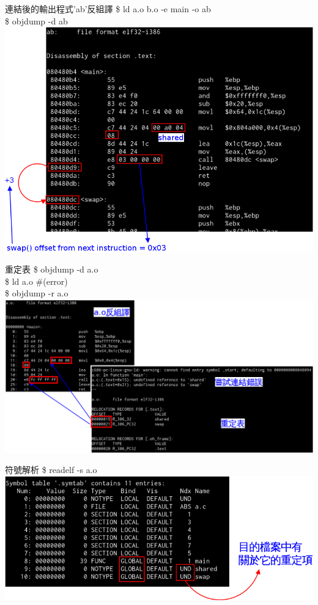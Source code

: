 \begin{frame}{連結後的輸出程式'ab'反組譯}
    \$ ld a.o b.o -e main -o ab\\
    \$ objdump -d ab\\
    \includegraphics[height=.7\textheight]{./img/objdump-ab1.png}
\end{frame}

\begin{frame}{重定表}
    \$ objdump -d a.o\\
    \$ ld a.o \#(error)\\
    \$ objdump -r a.o
    \includegraphics[width=\textwidth]{./img/relocationtbl1.png}
\end{frame}

\begin{frame}{符號解析}
    \$ readelf -s a.o
    \includegraphics[width=\textwidth]{./img/readelf-s-ao1.png}
\end{frame}


